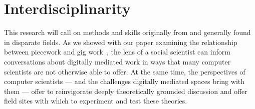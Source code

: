 \documentclass{article}
\newcommand{\topic}[1]{{\color{Blue}#1}}
\begin{document}
\section*{Interdisciplinarity}
\topic{This research will call on methods and skills originally from and generally found in disparate fields.}
As we showed with our paper examining the relationship between piecework and gig work~\cite{pieceworkCrowdworkGigwork},
the lens of a social scientist can inform conversations about digitally mediated work in ways that many computer scientists are not otherwise able to offer.
At the same time, the perspectives of computer scientists
--- and the challenges digitally mediated spaces bring with them ---
offer to reinvigorate deeply theoretically grounded discussion and offer field sites with which to experiment and test these theories.

\begin{comment}
In order to design a system that empowers workers,
a researchers must first attempt to understand a wide range of workers' circumstances:
The needs of workers;
the contexts in which they work;
their relationships with one another, with other groups, \& with institutions such as governments;
and more generally the paradigmatic views of gig workers.
Only then can one reasonably hope to design a system consistent with the views and broader culture of gig work.
\end{comment}

\begin{comment}
\citeauthor{uberAlgorithm} and \citeauthor{crowdcollab} have identified a number of ways that workers subvert and circumvent the intents of system--designers,
both in digital workplaces and where work is simply mediated digitally~\cite{uberAlgorithm,crowdcollab}.
These patterns of behavior elude algorithmic tracking and measurement because they deliberately avoid the \textit{a priori} assumptions made by the designers of systems,
who attempt to structure these sites of work in ways to create incentives for preferred behavior.
Identifying and understanding the details of this behavior thus begins with a qualitative,
ethnographic endeavor.
\end{comment}
\end{document}
